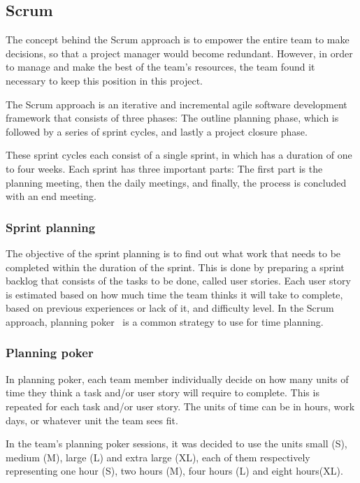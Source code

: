\subsection{Scrum}
The concept behind the Scrum approach is to empower the entire team to make decisions, so that a project manager would become redundant. However, in order to manage and make the best of the team's resources, the team found it necessary to keep this position in this project.

The Scrum approach is an iterative and incremental agile software development framework that consists of three phases: The outline planning phase, which is followed by a series of sprint cycles, and lastly a project closure phase.

These sprint cycles each consist of a single sprint, in which has a duration of one to four weeks. Each sprint has three important parts:
The first part is the planning meeting, then the daily  meetings, and finally, the process is concluded with an end meeting.

\subsubsection{Sprint planning}
\label{sec:sprintplanning}
The objective of the sprint planning is to find out what work that needs to be completed within the duration of the sprint. This is done by preparing a sprint backlog that consists of the tasks to be done, called user stories. Each user story is estimated based on how much time the team thinks it will take to complete, based on previous experiences or lack of it, and difficulty level. In the Scrum approach, planning poker~\cite{planningpoker} is a common strategy to use for time planning.

\subsubsection{Planning poker}
In planning poker, each team member individually decide on how many units of time they think a task and/or user story will require to complete. This is repeated for each task and/or user story. The units of time can be in hours, work days, or whatever unit the team sees fit.

In the team's planning poker sessions, it was decided to use the units small (S), medium (M), large (L) and extra large (XL), each of them respectively representing one hour (S), two hours (M), four hours (L) and eight hours(XL).

